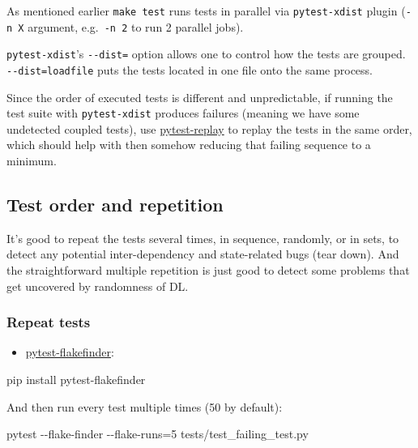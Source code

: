 \documentclass[
]{report}
\newenvironment{Shaded}{\begin{snugshade}}{\end{snugshade}}
\newcommand{\AttributeTok}[1]{\textcolor[rgb]{0.40,0.45,0.13}{#1}}
\newcommand{\ExtensionTok}[1]{\textcolor[rgb]{0.00,0.23,0.31}{#1}}
\newcommand{\NormalTok}[1]{\textcolor[rgb]{0.00,0.23,0.31}{#1}}
\newcommand{\OperatorTok}[1]{\textcolor[rgb]{0.37,0.37,0.37}{#1}}
\providecommand{\tightlist}{%
  \setlength{\itemsep}{0pt}\setlength{\parskip}{0pt}}\usepackage{longtable,booktabs,array}
\begin{document}
As mentioned earlier \texttt{make\ test} runs tests in parallel via
\texttt{pytest-xdist} plugin (\texttt{-n\ X} argument,
e.g.~\texttt{-n\ 2} to run 2 parallel jobs).

\texttt{pytest-xdist}'s \texttt{-\/-dist=} option allows one to control
how the tests are grouped. \texttt{-\/-dist=loadfile} puts the tests
located in one file onto the same process.

Since the order of executed tests is different and unpredictable, if
running the test suite with \texttt{pytest-xdist} produces failures
(meaning we have some undetected coupled tests), use
\href{https://github.com/ESSS/pytest-replay}{pytest-replay} to replay
the tests in the same order, which should help with then somehow
reducing that failing sequence to a minimum.

\subsection{Test order and repetition}\label{test-order-and-repetition}

It's good to repeat the tests several times, in sequence, randomly, or
in sets, to detect any potential inter-dependency and state-related bugs
(tear down). And the straightforward multiple repetition is just good to
detect some problems that get uncovered by randomness of DL.

\subsubsection{Repeat tests}\label{repeat-tests}

\begin{itemize}
\tightlist
\item
  \href{https://github.com/dropbox/pytest-flakefinder}{pytest-flakefinder}:
\end{itemize}

\begin{Shaded}
\begin{Highlighting}[]
\ExtensionTok{pip}\NormalTok{ install pytest{-}flakefinder}
\end{Highlighting}
\end{Shaded}

And then run every test multiple times (50 by default):

\begin{Shaded}
\begin{Highlighting}[]
\ExtensionTok{pytest} \AttributeTok{{-}{-}flake{-}finder} \AttributeTok{{-}{-}flake{-}runs}\OperatorTok{=}\NormalTok{5 tests/test\_failing\_test.py}
\end{Highlighting}
\end{Shaded}
\end{document}
